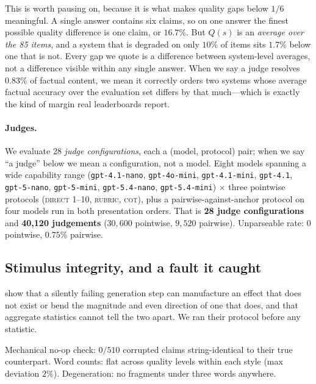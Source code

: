 \documentclass{article}
\theoremstyle{plain}
\theoremstyle{definition}
\begin{document}
This is worth pausing on, because it is what makes quality gaps below $1/6$ meaningful. A single
answer contains six claims, so on one answer the finest possible quality difference is one claim,
or $16.7\%$. But $Q(s)$ is an \emph{average over the 85 items}, and a system that is degraded on
only $10\%$ of items sits $1.7\%$ below one that is not. Every gap we quote is a difference
between system-level averages, not a difference visible within any single answer. When we say a
judge resolves $0.83\%$ of factual content, we mean it correctly orders two systems whose
average factual accuracy over the evaluation set differs by that much---which is exactly the
kind of margin real leaderboards report.

\paragraph{Judges.} We evaluate 28 \emph{judge configurations}, each a (model, protocol) pair; when we say ``a
judge'' below we mean a configuration, not a model. Eight models spanning a wide capability range
(\texttt{gpt-4.1-nano}, \texttt{gpt-4o-mini}, \texttt{gpt-4.1-mini}, \texttt{gpt-4.1},
\texttt{gpt-5-nano}, \texttt{gpt-5-mini}, \texttt{gpt-5.4-nano}, \texttt{gpt-5.4-mini})
$\times$ three pointwise protocols (\textsc{direct} 1--10, \textsc{rubric}, \textsc{cot}),
plus a pairwise-against-anchor protocol on four models run in both presentation orders. That
is \textbf{28 judge configurations} and \textbf{40{,}120 judgements} ($30{,}600$ pointwise,
$9{,}520$ pairwise). Unparseable rate: $0$ pointwise, $0.75\%$ pairwise.

\subsection{Stimulus integrity, and a fault it caught}
\label{sec:integrity}

\citet{balli2026oracle} show that a silently failing generation step can manufacture an effect
that does not exist or bend the magnitude and even direction of one that does, and that
aggregate statistics cannot tell the two apart. We ran their protocol before any statistic.

Mechanical no-op check: $0/510$ corrupted claims string-identical to their true counterpart.
Word counts: flat across quality levels within each style (max deviation $2\%$). Degeneration:
no fragments under three words anywhere.
\end{document}
